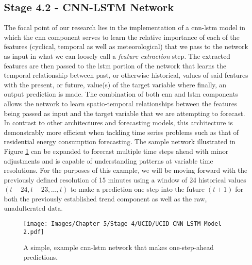\subsection{Stage 4.2 - CNN-LSTM Network}
\label{subsec:Methodology:Stage-4:CNN-LSTM-Network}
The focal point of our research lies in the implementation of  a \gls{cnn-lstm} model in which the \gls{cnn} component serves to learn the relative importance of each of the features (cyclical, temporal as well as meteorological) that we pass to the network as input in what we can loosely call a \textit{feature extraction} step. The extracted features are then passed to the \gls{lstm} portion of the network that learns the temporal relationship between past, or otherwise historical, values of said features with the present, or future, value(s) of the target variable where finally, an output prediction is made. The combination of both \gls{cnn} and \gls{lstm} components allows the network to learn spatio-temporal relationships between the features being passed as input and the target variable that we are attempting to forecast. In contrast to other architectures and forecasting models, this architecture is demonstrably more efficient \cite{Kim} when tackling time series problems such as that of residential energy consumption forecasting. The sample network illustrated in Figure \ref{fig:UCID-CNN-LSTM-Model} can be expanded to forecast multiple time steps ahead with minor adjustments and is capable of understanding patterns at variable time resolutions. For the purposes of this example, we will be moving forward with the previously defined resolution of 15 minutes using a window of 24 historical values $(t - 24, t - 23, ..., t)$ to make a prediction one step into the future $(t + 1)$ for both the previously established trend component as well as the raw, unadulterated data.

\begin{figure}[hbt!]
    \begin{adjustwidth}{-1.5cm}{-1.5cm}%
        \centering
        \texttt{[image: Images/Chapter 5/Stage 4/UCID/UCID-CNN-LSTM-Model-2.pdf]}
        \caption{A simple, example \gls{cnn-lstm} network that makes one-step-ahead predictions.}
        \label{fig:UCID-CNN-LSTM-Model}
    \end{adjustwidth}
\end{figure}

